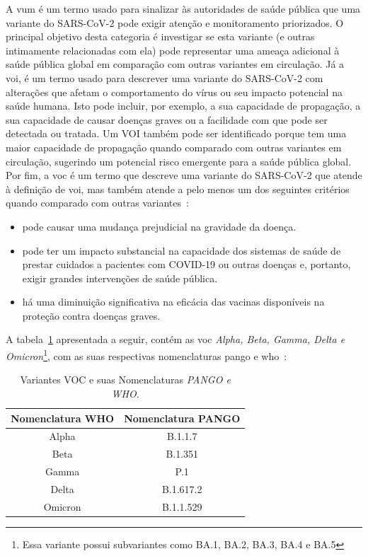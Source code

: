 A \gls{vum} é um termo usado para sinalizar às autoridades de saúde pública que uma variante do SARS-CoV-2 pode exigir atenção e monitoramento priorizados. O principal objetivo desta categoria é investigar se esta variante (e outras intimamente relacionadas com ela) pode representar uma ameaça adicional à saúde pública global em comparação com outras variantes em circulação.
Já a \gls{voi}, é um termo usado para descrever uma variante do SARS-CoV-2 com alterações que afetam o comportamento do vírus ou seu impacto potencial na saúde humana. Isto pode incluir, por exemplo, a sua capacidade de propagação, a sua capacidade de causar doenças graves ou a facilidade com que pode ser detectada ou tratada. Um VOI também pode ser identificado porque tem uma maior capacidade de propagação quando comparado com outras variantes em circulação, sugerindo um potencial risco emergente para a saúde pública global. Por fim, a \gls{voc} é um termo que descreve uma variante do SARS-CoV-2 que atende à definição de \gls{voi}, mas também atende a pelo menos um dos seguintes critérios quando comparado com outras variantes~\cite{who_variants}:
\begin{itemize}
  \item pode causar uma mudança prejudicial na gravidade da doença.
  \item   pode ter um impacto substancial na capacidade dos sistemas de saúde de prestar cuidados a pacientes com COVID-19 ou outras doenças e, portanto, exigir grandes intervenções de saúde pública.
  \item há uma diminuição significativa na eficácia das vacinas disponíveis na proteção contra doenças graves.
\end{itemize}

A tabela~\ref{tab:nomenclaturaPangoWho} apresentada a seguir, contém as \gls{voc} \textit{Alpha, Beta, Gamma, Delta e Omicron}\footnote{Essa variante possui subvariantes como BA.1, BA.2, BA.3, BA.4 e BA.5}, com as suas respectivas nomenclaturas \gls{pango} e \gls{who}~\cite{covid19_cascella_2020}:

\begin{table}[htb]
  \caption{Variantes VOC e suas Nomenclaturas \textit{PANGO e WHO}.}
  \begin{center}
    \begin{tabular}{c|c}
      \hline
      Nomenclatura WHO & Nomenclatura PANGO \\
      \hline
      Alpha            & B.1.1.7            \\
      Beta             & B.1.351            \\
      Gamma            & P.1                \\
      Delta            & B.1.617.2          \\
      Omicron          & B.1.1.529          \\
      \hline
    \end{tabular}
  \end{center}
  \label{tab:nomenclaturaPangoWho}
\end{table}

